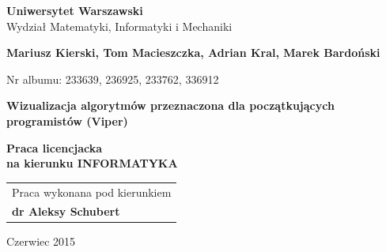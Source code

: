 \documentclass[a4paper,twoside,openright,11pt]{report}
\begin{document}
\begin{titlepage}%
    \let\footnotesize\small
    \let\footnoterule\relax
    \let \footnote \thanks
    \begin{center}%
      {\LARGE\textbf{Uniwersytet Warszawski}\\
        Wydzia\l{} Matematyki, Informatyki i Mechaniki\par}
      \vspace{1cm plus 1fill} 
      {\Large\bf Mariusz Kierski, Tom Macieszczka, Adrian Kral, Marek Bardoński\par}
      \vspace{0.2cm}
      {\large Nr albumu: 233639, 236925, 233762, 336912\par}
      \vspace{8mm plus .1fill}
      {\Huge\textbf{Wizualizacja algorytmów przeznaczona dla początkujących programistów (Viper)}\par}
      \vspace{8mm plus .1fill}
      {\large\bf Praca licencjacka\\[3pt]
        na kierunku \MakeUppercase{Informatyka} \\}
      \vspace{2cm plus 1.5fill}
      \begin{flushright}\large
        \begin{tabular}{l}
          Praca wykonana pod kierunkiem\\
          \bfseries dr Aleksy Schubert
        \end{tabular}
      \end{flushright}
      \vspace{1cm plus 1fill}
      {\large Czerwiec 2015}
    \end{center}
  \end{titlepage}%
\end{document}
